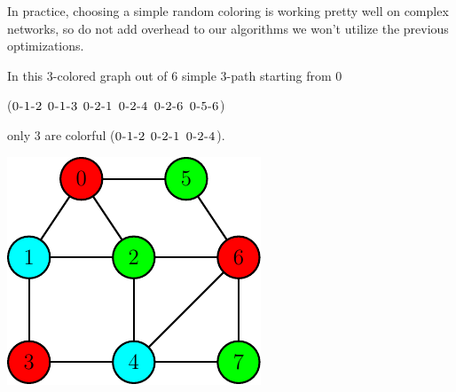 In practice, choosing a simple random coloring is working pretty well on complex networks, 
so do not add overhead to our algorithms we won't utilize the previous optimizations.\medskip

\begin{minipage}{0.55\textwidth}\raggedright
	\begin{esempio}
		In this $3$-colored graph out of $6$ simple $3$-path starting from $0$\medskip
		
		($\textsc{0-1-2}$ $\textsc{0-1-3}$ $\textsc{0-2-1}$ $\textsc{0-2-4}$ $\textsc{0-2-6}$ $\textsc{0-5-6}$)\medskip
		
		only $3$ are colorful ($\textsc{0-1-2}$ $\textsc{0-2-1}$ $\textsc{0-2-4}$).
	\end{esempio}
\end{minipage}
\begin{minipage}{0.35\textwidth}
	\includegraphics[width=\linewidth]{figure/figure-2-6}
\end{minipage}

\noindent

\clearpage